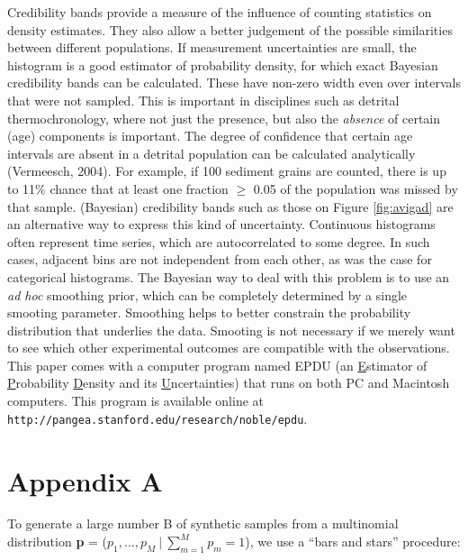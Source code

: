 \documentclass{article}
\begin{document}
Credibility  bands provide  a  measure of  the  influence of  counting
statistics on  density estimates.  They also allow  a better judgement
of  the  possible  similarities  between  different  populations.   If
measurement uncertainties are small, the histogram is a good estimator
of probability density, for which exact Bayesian credibility bands can
be  calculated.  These have  non-zero width  even over  intervals that
were not sampled.   This is important in disciplines  such as detrital
thermochronology,  where not  just  the presence,  but  also the  {\it
absence}  of certain  (age) components  is important.   The  degree of
confidence  that  certain  age  intervals  are absent  in  a  detrital
population  can  be calculated  analytically  (Vermeesch, 2004).   For
example,  if 100  sediment grains  are counted,  there is  up  to 11\%
chance that  at least one fraction  $\geq$ 0.05 of  the population was
missed by that  sample. (Bayesian) credibility bands such  as those on
Figure \ref{fig:avigad} are an alternative way to express this kind of
uncertainty.  Continuous histograms often represent time series, which
are autocorrelated to  some degree.  In such cases,  adjacent bins are
not  independent from  each other,  as  was the  case for  categorical
histograms.  The Bayesian  way to deal with this problem  is to use an
{\it ad hoc} smoothing prior,  which can be completely determined by a
single smooting  parameter.  Smoothing  helps to better  constrain the
probability  distribution that  underlies the  data.  Smooting  is not
necessary if we  merely want to see which  other experimental outcomes
are compatible with the observations.\\

This paper  comes with a  computer program named EPDU  (an {\underline
E}stimator  of {\underline P}robability  {\underline D}ensity  and its
{\underline  U}ncertainties)  that  runs  on  both  PC  and  Macintosh
computers.      This     program     is    available     online     at
\texttt{http://pangea.stanford.edu/research/noble/epdu}.

\clearpage

\section*{Appendix A} \label{app:A}

To generate a  large number B of synthetic  samples from a multinomial
distribution {\bf p}  = ($p_1,...  ,p_M ~|~ \sum_{m=1}^Mp_m  = 1$), we
use a ``bars and stars'' procedure:
\end{document}
